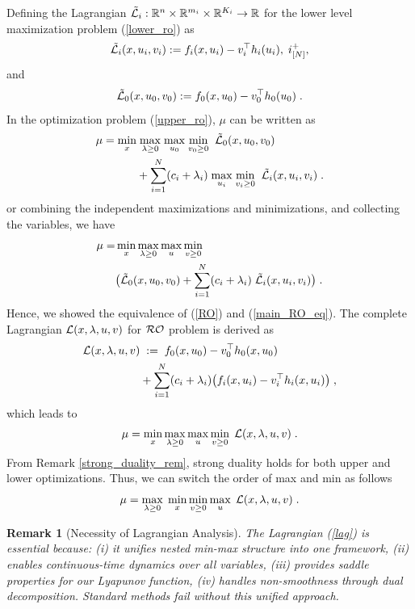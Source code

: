\documentclass[journal,twoside,web]{ieeecolor}
\newcommand{\rev}[1]{\textcolor{revisionblue}{#1}}
\newtheorem{remark}{Remark}
\begin{document}
Defining the Lagrangian $\tilde {\cal L}_i:\mathbb{R}^n \times \mathbb{R}^{m_i} \times \mathbb{R}^{K_i} \rightarrow \mathbb{R}$ for the lower level maximization problem (\ref{lower_ro}) as
\begin{align} \label{lower_lag}
\tilde {\cal L}_i(x,u_i,v_i):=f_i(x,u_i)-v_i^\top h_{i}(u_i),\;i^+_{[N]},
\end{align}
and
\begin{align} \label{upper_lag}
\tilde {\cal L}_0(x,u_0,v_0):=f_0(x,u_0)-v_0^\top h_{0}(u_0)\;.
\end{align}
In the optimization problem (\ref{upper_ro}), $\mu$ can be written as
\begin{align} \label{main_RO_eq}
\mu=\underset{x}{\min}&\;\underset{\lambda\geq 0}{\max}\;\underset{u_0}{\max}\;\underset{v_0\geq 0}{\min}\;\; \tilde{\cal L}_0(x,u_0,v_0)\\
&+\sum_{i=1}^N (c_i+\lambda_i)\; \underset{u_i}{\max}\;\underset{v_{i}\geq 0}{\min}\;\;\tilde {\cal L}_i(x,u_i,v_i)\;\nonumber.
\end{align}
or combining the independent maximizations and minimizations, and collecting the variables, we have
\begin{align}\label{main_RO2_eq}
\mu=&\min_{x}\max_{\lambda\geq 0}\max_{u}\min_{v\geq 0} \\
&\big(\tilde{\cal L}_0(x,u_0,v_0)+\sum_{i=1}^N (c_i+\lambda_i) \; \tilde {\cal L}_i(x,u_i,v_i)\big)\;.\nonumber
\end{align}
Hence, we showed the equivalence of (\ref{RO}) and (\ref{main_RO_eq}).
The complete Lagrangian ${\cal L}(x,\lambda,u,v)$ for ${\cal RO}$ problem is derived as
\begin{align}
{\cal L}(x,\lambda,u,v)&\;:=\;f_0(x,u_0)-v_0^\top h_0(x,u_0)\nonumber\\
&+\sum_{i=1}^N (c_i+\lambda_i)\big(f_i(x,u_i)-v_i^\top h_i(x,u_i)\big)\;,
\label{lag}
\end{align}
which leads to
\begin{align*}
\mu=\min_{x}\max_{\lambda\geq 0}\max_{u}\min_{v\geq 0}\;{\cal L}(x,\lambda,u,v)\;.
\end{align*}
From Remark \ref{strong_duality_rem}, strong duality holds for both upper and lower optimizations. Thus, we can switch the order of max and min as follows
\begin{equation}\label{dual.eq}
\mu=\max_{\lambda\geq 0}\;\min_{x}\min_{v\geq 0} \max_{u}\;{\cal L}(x,\lambda,u,v)\;.
\end{equation}

\begin{remark}[\rev{Necessity of Lagrangian Analysis}]
\rev{The Lagrangian (\ref{lag}) is essential because: (i) it unifies nested min-max structure into one framework, (ii) enables continuous-time dynamics over all variables, (iii) provides saddle properties for our Lyapunov function, (iv) handles non-smoothness through dual decomposition. Standard methods fail without this unified approach.}
\end{remark}
\end{document}
